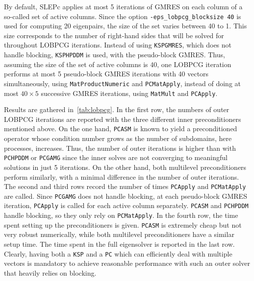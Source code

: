 \documentclass[3p,11pt]{elsarticle}
\newcommand{\pk}[1]{\texttt{#1}}
\begin{document}
By default, SLEPc applies at most 5 iterations
of GMRES on each column of a so-called set of active columns. Since the option
\pk{-eps\_lobpcg\_blocksize 40} is used for computing 20 eigenpairs, the size
of the set varies between 40 to 1. This size corresponds to the number of
right-hand sides that will be solved for throughout LOBPCG iterations.
Instead of using \pk{KSPGMRES}, which does not handle blocking, \pk{KSPHPDDM}
is used, with the pseudo-block GMRES. Thus, assuming the size of the
set of active columns is 40, one LOBPCG iteration performs at most 5
pseudo-block GMRES iterations with 40 vectors simultaneously, using \pk{MatProductNumeric}
and \pk{PCMatApply}, instead of doing at most $40\times 5$ successive GMRES
iterations, using \pk{MatMult} and \pk{PCApply}.

Results are gathered
in~\cref{tab:lobpcg}. In the first row, the numbers of outer LOBPCG iterations
are reported with the three different inner preconditioners mentioned above.
On the one hand, \pk{PCASM} is known to yield a preconditioned operator whose condition number
grows as the number of subdomains, here processes, increases. Thus, the number
of outer iterations is higher than with \pk{PCHPDDM} or \pk{PCGAMG} since the
inner solves are not converging to meaningful solutions in just 5 iterations.
On the other hand, both multilevel preconditioners perform similarly, with a minimal difference in the
number of outer iterations. The second and third rows record
the number of times \pk{PCApply} and \pk{PCMatApply} are called. Since
\pk{PCGAMG} does not handle blocking, at each pseudo-block GMRES iteration,
\pk{PCApply} is called for each active column separately. \pk{PCASM} and
\pk{PCHPDDM} handle blocking, so they only rely on \pk{PCMatApply}. In the fourth
row, the time spent setting up the preconditioners is given. \pk{PCASM} is
extremely cheap but not very robust numerically, while both multilevel
preconditioners have a similar setup time. The
time spent in the full eigensolver is reported in the last row. Clearly, having both a \pk{KSP}
and a \pk{PC} which can efficiently deal with multiple vectors is mandatory to
achieve reasonable performance with such an outer solver that heavily relies on
blocking.
\mytable
\pgfplotstabletranspose[
    colnames from=PC,
    input colnames to=PC
]\mytablenew{\mytable}
\end{document}
